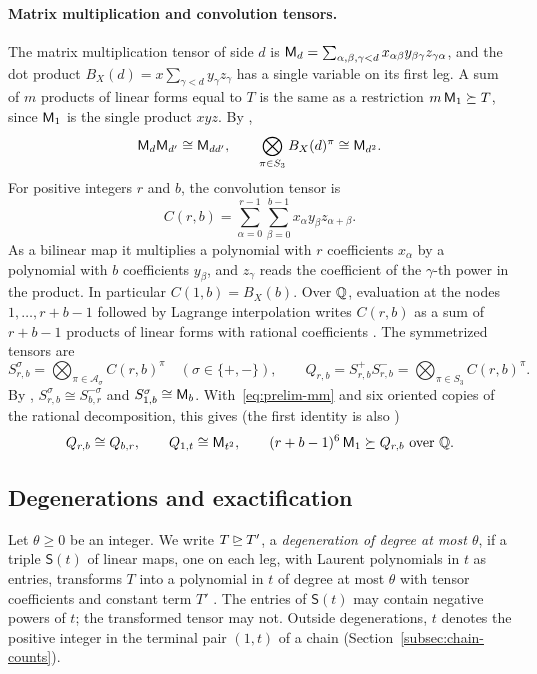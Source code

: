 \paragraph{Matrix multiplication and convolution tensors.}
The matrix multiplication tensor of side \(d\) is
\(\mathsf M_d=\sum_{\alpha,\beta,\gamma<d}x_{\alpha\beta}y_{\beta\gamma}z_{\gamma\alpha}\),
and the dot product \(B_X(d)=x\sum_{\gamma<d}y_\gamma z_\gamma\) has a
single variable on its first leg. A sum of \(m\) products of linear forms
equal to \(T\) is the same as a restriction \(m\,\mathsf M_1\succeq T\), since
\(\mathsf M_1\) is the single product \(xyz\). By
\citep[(2.1) and (2.2)]{FinCon26},
\begin{equation}\label{eq:prelim-mm}
 \mathsf M_d\mathsf M_{d'}\cong\mathsf M_{dd'},\qquad
 \bigotimes_{\pi\in S_3}B_X(d)^\pi\cong\mathsf M_{d^2}.
\end{equation}
For positive integers \(r\) and \(b\), the convolution tensor
\citep[(2.3)]{FinCon26} is
\[
 C(r,b)=\sum_{\alpha=0}^{r-1}\sum_{\beta=0}^{b-1}x_\alpha y_\beta z_{\alpha+\beta}.
\]
As a bilinear map it multiplies a polynomial with \(r\) coefficients
\(x_\alpha\) by a polynomial with \(b\) coefficients \(y_\beta\), and
\(z_\gamma\) reads the coefficient of the \(\gamma\)-th power in the
product. In particular \(C(1,b)=B_X(b)\). Over \(\mathbb Q\), evaluation at
the nodes \(1,\ldots,r+b-1\) followed by Lagrange interpolation writes
\(C(r,b)\) as a sum of \(r+b-1\) products of linear forms with rational
coefficients \citep[Lemma~9.1(a)]{FinCon26}. The symmetrized tensors
\citep[(2.5) and (2.7)]{FinCon26} are
\[
 S^\sigma_{r,b}=\bigotimes_{\pi\in\mathcal A_\sigma}C(r,b)^\pi
 \quad(\sigma\in\{+,-\}),\qquad
 Q_{r,b}=S^+_{r,b}S^-_{r,b}=\bigotimes_{\pi\in S_3}C(r,b)^\pi .
\]
By \citep[(2.6)]{FinCon26}, \(S^\sigma_{r,b}\cong S^{-\sigma}_{b,r}\)
and \(S^\sigma_{1,b}\cong\mathsf M_b\). With~\eqref{eq:prelim-mm} and six
oriented copies of the rational decomposition, this gives (the first
identity is also \citep[(2.8)]{FinCon26})
\begin{equation}\label{eq:prelim-Q}
 Q_{r,b}\cong Q_{b,r},\qquad Q_{1,t}\cong\mathsf M_{t^2},\qquad
 (r+b-1)^6\,\mathsf M_1\succeq Q_{r,b}\ \text{over }\mathbb Q .
\end{equation}

\subsection{Degenerations and exactification}
\label{subsec:prelim-degenerations}

Let \(\theta\ge0\) be an integer. We write \(T\unrhd T'\), a
\emph{degeneration of degree at most \(\theta\)}, if a triple \(\mathsf S(t)\) of
linear maps, one on each leg, with Laurent polynomials in \(t\) as
entries, transforms \(T\) into a polynomial in \(t\) of degree at most
\(\theta\) with tensor coefficients and constant term \(T'\)
\citep[Section~2.3]{FinCon26}. The entries of \(\mathsf S(t)\) may contain
negative powers of \(t\); the transformed tensor may not. Outside
degenerations, \(t\) denotes the positive integer in the terminal pair
\((1,t)\) of a chain (Section~\ref{subsec:chain-counts}).

